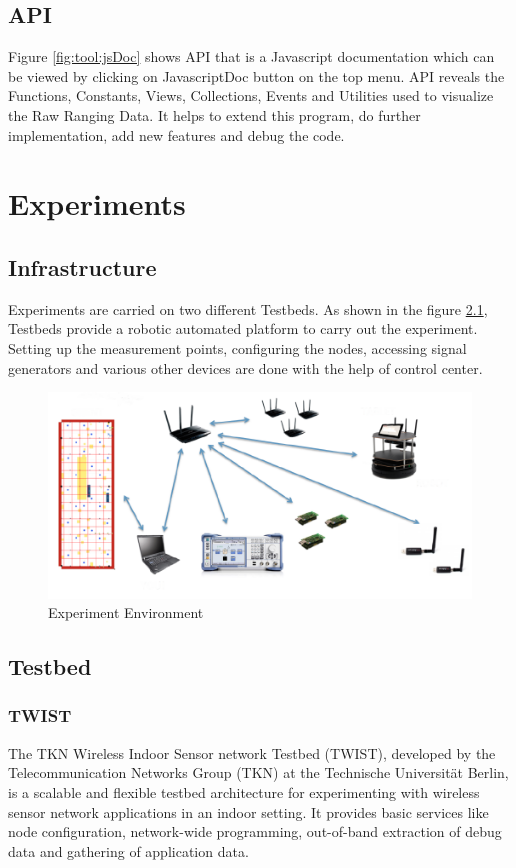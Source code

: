 \documentclass[11pt,a4paper,headinclude,footinclude,chapterprefix=on]{scrreprt}
\begin{document}
\section{API} Figure \ref{fig:tool:jsDoc} shows API that is a Javascript documentation which can be viewed by clicking on JavascriptDoc button on the top menu. API reveals the Functions, Constants, Views, Collections, Events and Utilities used to visualize the Raw Ranging Data. It helps to extend this program, do further implementation, add new features and debug the code. 

\chapter{Experiments} 
\section{Infrastructure} Experiments are carried on two different Testbeds. As shown in the figure \ref{fig:experiment}, Testbeds provide a robotic automated platform to carry out the experiment. Setting up the measurement points, configuring the nodes, accessing signal generators and various other devices are done with the help of control center. 
\begin{figure}
	[!h] \centering 
	\includegraphics[width=13cm]{Images/evari.png} \caption{Experiment Environment} \label{fig:experiment} 
\end{figure}

\section{Testbed} 
\subsection{TWIST} The TKN Wireless Indoor Sensor network Testbed (TWIST), developed by the Telecommunication Networks Group (TKN) at the Technische Universität Berlin, is a scalable and flexible testbed architecture for experimenting with wireless sensor network applications in an indoor setting. It provides basic services like node configuration, network-wide programming, out-of-band extraction of debug data and gathering of application data.
\end{document}
